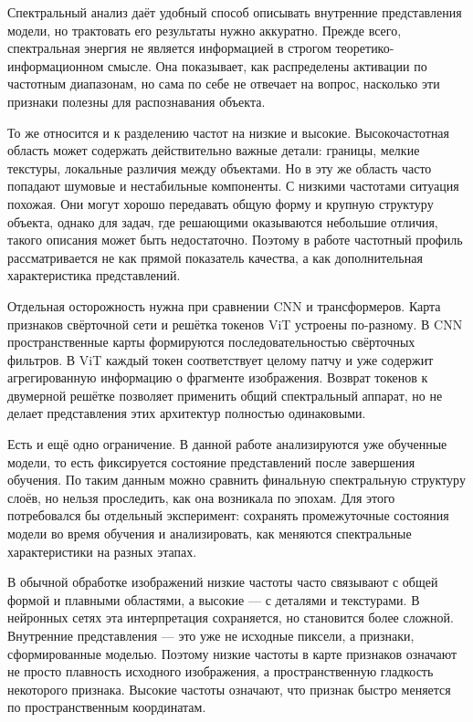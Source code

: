 Спектральный анализ даёт удобный способ описывать внутренние представления модели, но трактовать его результаты нужно аккуратно. Прежде всего, спектральная энергия не является информацией в строгом теоретико-информационном смысле. Она показывает, как распределены активации по частотным диапазонам, но сама по себе не отвечает на вопрос, насколько эти признаки полезны для распознавания объекта.

То же относится и к разделению частот на низкие и высокие. Высокочастотная область может содержать действительно важные детали: границы, мелкие текстуры, локальные различия между объектами. Но в эту же область часто попадают шумовые и нестабильные компоненты. С низкими частотами ситуация похожая. Они могут хорошо передавать общую форму и крупную структуру объекта, однако для задач, где решающими оказываются небольшие отличия, такого описания может быть недостаточно. Поэтому в работе частотный профиль рассматривается не как прямой показатель качества, а как дополнительная характеристика представлений.

Отдельная осторожность нужна при сравнении CNN и трансформеров. Карта признаков свёрточной сети и решётка токенов ViT устроены по-разному. В CNN пространственные карты формируются последовательностью свёрточных фильтров. В ViT каждый токен соответствует целому патчу и уже содержит агрегированную информацию о фрагменте изображения. Возврат токенов к двумерной решётке позволяет применить общий спектральный аппарат, но не делает представления этих архитектур полностью одинаковыми.

Есть и ещё одно ограничение. В данной работе анализируются уже обученные модели, то есть фиксируется состояние представлений после завершения обучения. По таким данным можно сравнить финальную спектральную структуру слоёв, но нельзя проследить, как она возникала по эпохам. Для этого потребовался бы отдельный эксперимент: сохранять промежуточные состояния модели во время обучения и анализировать, как меняются спектральные характеристики на разных этапах.

В обычной обработке изображений низкие частоты часто связывают с общей формой и плавными областями, а высокие — с деталями и текстурами. В нейронных сетях эта интерпретация сохраняется, но становится более сложной. Внутренние представления — это уже не исходные пиксели, а признаки, сформированные моделью. Поэтому низкие частоты в карте признаков означают не просто плавность исходного изображения, а пространственную гладкость некоторого признака. Высокие частоты означают, что признак быстро меняется по пространственным координатам.

